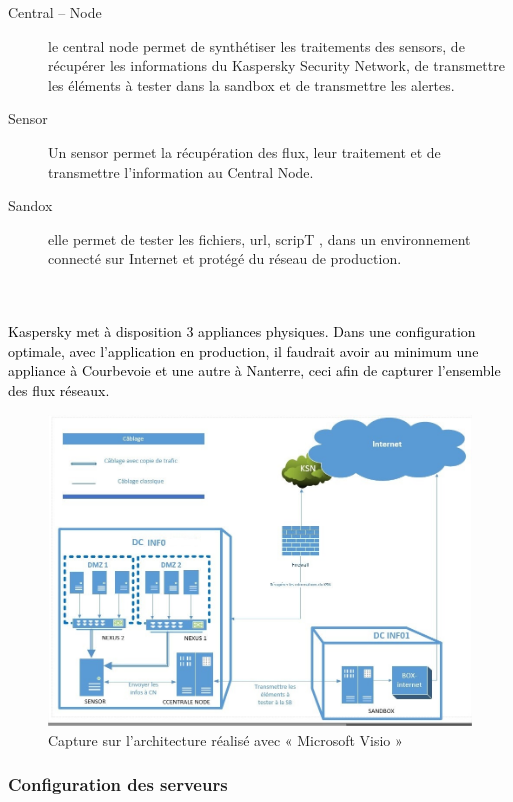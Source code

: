 \documentclass[a4paper,12pt]{report}
\begin{document}
\begin{description}
	\item [Central – Node] le central node permet de synthétiser les traitements des sensors, de récupérer les informations du Kaspersky Security Network, de transmettre les éléments à tester dans la sandbox et de transmettre les alertes.
	\item [Sensor] Un sensor permet la récupération des flux, leur traitement et de transmettre l’information au Central Node.
	\item [Sandox] elle permet de tester les fichiers, url, scripT , dans un environnement connecté sur Internet et protégé du réseau de production.
	
\end{description}
	
~~\\
~~\\
\textcolor{black}{Kaspersky met à disposition 3 appliances physiques. Dans une configuration optimale, avec l’application en production, il faudrait avoir au minimum une appliance à Courbevoie et une autre à Nanterre, ceci afin de capturer l’ensemble des flux réseaux.}

\begin{figure}[H]
	\begin{center}
		\includegraphics[width=0.9\linewidth]{Projet_KATA/archi_kata}
\end{center}
	\caption{Capture sur l’architecture réalisé avec « Microsoft Visio »}
	\label{fig:6}	
\end{figure}		 
		 
\subsubsection{Configuration des serveurs }
\end{document}
